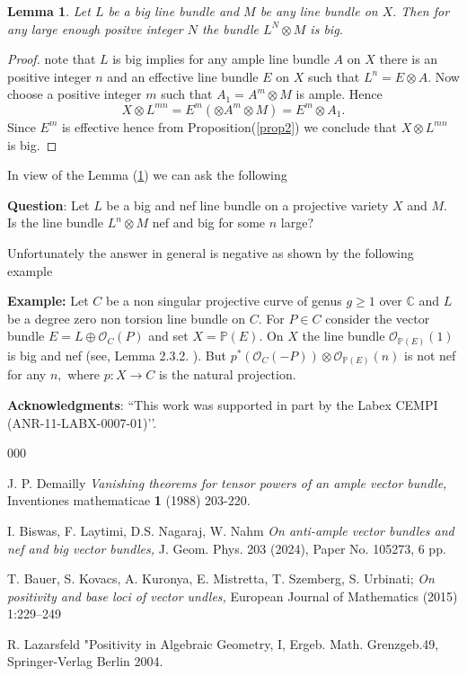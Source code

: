 \documentclass[12pt]{amsart}
\newtheorem{lem}[subsection]{Lemma}
\theoremstyle{definition}
\numberwithin{equation}{section}
\begin{document}
\begin{lem}\label{lem1}
Let $L$ be a big line bundle and $M$ be any line bundle on $X.$ Then for any large enough positve integer $N$ the bundle $L^N \otimes M$ is big. 
\end{lem}

\begin{proof}
 note that $L$ is big implies for any ample line bundle $A$ on $X$  there is an positive integer $n$ and an effective line bundle $E$ on $X$ such that $L^n = E \otimes A.$ 
Now choose a positive  integer $m$ such that $A_1 = A^m\otimes M$ is ample. Hence 
$$X\otimes L^{mn} = E^m (\otimes A^m \otimes M) = E^m \otimes A_1.$$
Since $E^m$ is effective hence from  Proposition(\ref{prop2}) we conclude that $X\otimes L^{mn}$ is big.
\end{proof}



In view of the  Lemma (\ref{lem1}) we can ask the following

\bigskip
{\bf Question}: Let $L$ be a big and nef line bundle on a projective variety $X$ and $M.$ Is the line bundle $L^n \otimes M$ nef and big for some $n$ large? 

\bigskip

Unfortunately the answer in general is  negative as shown by the following example

\bigskip
{\bf Example:} Let $C$ be a non singular  projective curve of genus $g \geq 1$ over  $\mathbb{C}$  and $L$ be a degree zero non torsion line bundle on $C.$
For  $P \in C$ consider  the vector bundle $E = L \oplus {\mathcal O}_C (P)$ and set $X = \mathbb{P}(E).$ 
On $X$ the line bundle $\mathcal{O}_{\mathbb{P}(E)}(1)$ 
is big and nef (see, Lemma 2.3.2. \cite{Laz}). But $p^*(\mathcal{O}_C(-P))\otimes \mathcal{O}_{\mathbb{P}(E)}(n) $ is not nef for any $n,$ where 
$p : X \to C$ is the natural projection.

\bigskip


{\bf Acknowledgments}: ``This work was supported in part by the Labex CEMPI (ANR-11-LABX-0007-01)’’. 

\begin{thebibliography}{000}

  J. P. Demailly  {\it Vanishing theorems for tensor powers of an ample  vector bundle,} Inventiones mathematicae  {\bf 1} (1988) 203-220.

 I. Biswas, 
F. Laytimi, D.S. Nagaraj, W. Nahm {\it On anti-ample vector bundles and nef and big vector bundles,} J. Geom. Phys. 203 (2024), Paper No. 105273, 6 pp.

 T. Bauer, S. Kovacs, A. Kuronya, E. Mistretta, T. Szemberg, S. Urbinati; {\it On positivity and base loci of vector
undles,} European Journal of Mathematics (2015) 1:229–249

 R. Lazarsfeld "Positivity in Algebraic
Geometry, I, Ergeb. Math. Grenzgeb.49,  Springer-Verlag Berlin 2004.

\end{thebibliography}


  
\end{document}

